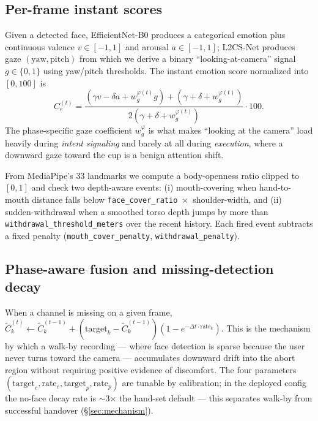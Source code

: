 \documentclass{article}
\newcommand{\code}[1]{\texttt{\small #1}}
\begin{document}
\subsection{Per-frame instant scores}
\label{sec:instant}

Given a detected face, EfficientNet-B0 produces a categorical emotion plus continuous valence $v \in [-1, 1]$ and arousal $a \in [-1, 1]$; L2CS-Net produces gaze $(\text{yaw}, \text{pitch})$ from which we derive a binary ``looking-at-camera'' signal $g \in \{0, 1\}$ using yaw/pitch thresholds. The instant emotion score normalized into $[0, 100]$ is
\begin{equation}
C_e^{(t)} = \frac{(\gamma v - \delta a + w_g^{\varphi(t)} g) + (\gamma + \delta + w_g^{\varphi(t)})}{2(\gamma + \delta + w_g^{\varphi(t)})} \cdot 100.
\end{equation}
The phase-specific gaze coefficient $w_g^{\varphi}$ is what makes ``looking at the camera'' load heavily during \emph{intent signaling} and barely at all during \emph{execution}, where a downward gaze toward the cup is a benign attention shift.

From MediaPipe's 33 landmarks we compute a body-openness ratio clipped to $[0, 1]$ and check two depth-aware events: (i) mouth-covering when hand-to-mouth distance falls below \code{face\_cover\_ratio}~$\times$~shoulder-width, and (ii) sudden-withdrawal when a smoothed torso depth jumps by more than \code{withdrawal\_threshold\_meters} over the recent history. Each fired event subtracts a fixed penalty (\code{mouth\_cover\_penalty}, \code{withdrawal\_penalty}).

\subsection{Phase-aware fusion and missing-detection decay}

When a channel is missing on a given frame, $\tilde{C}_k^{(t)} \leftarrow \tilde{C}_k^{(t-1)} + (\text{target}_k - \tilde{C}_k^{(t-1)}) (1 - e^{-\Delta t \cdot \text{rate}_k})$. This is the mechanism by which a walk-by recording --- where face detection is sparse because the user never turns toward the camera --- accumulates downward drift into the abort region without requiring positive evidence of discomfort. The four parameters $(\text{target}_e, \text{rate}_e, \text{target}_p, \text{rate}_p)$ are tunable by calibration; in the deployed config the no-face decay rate is $\sim$3$\times$ the hand-set default --- this separates walk-by from successful handover (\S\ref{sec:mechanism}).
\end{document}
